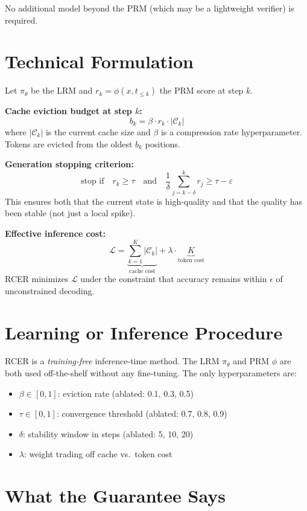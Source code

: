 \documentclass[10pt,twocolumn]{article}
\begin{document}
No additional model beyond the PRM (which may be a lightweight verifier) is
required.

\section{Technical Formulation}

Let $\pi_\theta$ be the LRM and $r_k = \phi(x, t_{\leq k})$ the PRM score at step $k$.

\textbf{Cache eviction budget at step $k$:}
\[
  b_k = \beta \cdot r_k \cdot |\mathcal{C}_k|
\]
where $|\mathcal{C}_k|$ is the current cache size and $\beta$ is a
compression rate hyperparameter. Tokens are evicted from the oldest
$b_k$ positions.

\textbf{Generation stopping criterion:}
\[
  \text{stop if} \quad r_k \geq \tau \quad \text{and} \quad
  \frac{1}{\delta}\sum_{j=k-\delta}^{k} r_j \geq \tau - \varepsilon
\]
This ensures both that the current state is high-quality and that the
quality has been stable (not just a local spike).

\textbf{Effective inference cost:}
\[
  \mathcal{L} = \underbrace{\sum_{k=1}^{K} |\mathcal{C}_k|}_{\text{cache cost}}
  + \lambda \cdot \underbrace{K}_{\text{token cost}}
\]
RCER minimizes $\mathcal{L}$ under the constraint that accuracy remains
within $\epsilon$ of unconstrained decoding.

\section{Learning or Inference Procedure}

RCER is a \emph{training-free} inference-time method. The LRM $\pi_\theta$
and PRM $\phi$ are both used off-the-shelf without any fine-tuning. The
only hyperparameters are:
\begin{itemize}[itemsep=2pt,parsep=0pt]
  \item $\beta \in [0, 1]$: eviction rate (ablated: 0.1, 0.3, 0.5)
  \item $\tau \in [0, 1]$: convergence threshold (ablated: 0.7, 0.8, 0.9)
  \item $\delta$: stability window in steps (ablated: 5, 10, 20)
  \item $\lambda$: weight trading off cache vs.\ token cost
\end{itemize}

\section{What the Guarantee Says}
\end{document}
